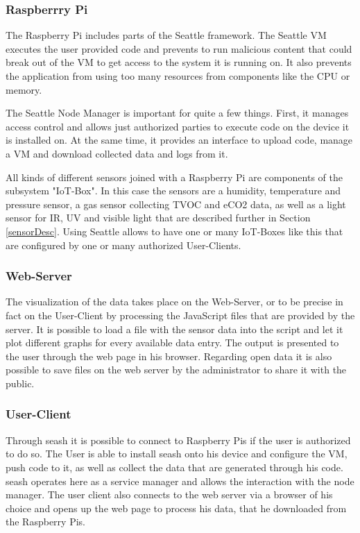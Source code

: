 \documentclass[bachelorthesis, grey, english]{mas-thesis-chapters} %
\begin{document}
\subsubsection{Raspberrry Pi}

The Raspberry Pi includes parts of the Seattle framework. The Seattle \gls{VM} executes the user provided code and prevents to run malicious content that could break out of the \gls{VM} to get access to the system it is running on. It also prevents the application from using too many resources from components like the \gls{CPU} or memory. \cite[38]{seattlePaper}

The Seattle Node Manager is important for quite a few things. First, it manages access control and allows just authorized parties to execute code on the device it is installed on. At the same time, it provides an interface to upload code, manage a \gls{VM} and download collected data and logs from it. \cite[38]{seattlePaper}

All kinds of different sensors joined with a Raspberry Pi are components of the subsystem "\gls{IoT}-Box". In this case the sensors are a humidity, temperature and pressure sensor, a gas sensor collecting \gls{TVOC} and \gls{eCO2} data, as well as a light sensor for \gls{IR}, \gls{UV} and visible light that are described further in Section \ref{sensorDesc}. Using Seattle allows to have one or many \gls{IoT}-Boxes like this that are configured by one or many authorized User-Clients.

\subsubsection{Web-Server}

The visualization of the data takes place on the Web-Server, or to be precise in fact on the User-Client by processing the JavaScript files that are provided by the server. It is possible to load a file with the sensor data into the script and let it plot different graphs for every available data entry. The output is presented to the user through the web page in his browser. Regarding open data it is also possible to save files on the web server by the administrator to share it with the public.

\subsubsection{User-Client}

Through \gls{seash} it is possible to connect to Raspberry Pis if the user is authorized to do so. The User is able to install \gls{seash} onto his device and configure the \gls{VM}, push code to it, as well as collect the data that are generated through his code. \Gls{seash} operates here as a service manager and allows the interaction with the node manager. The user client also connects to the web server via a browser of his choice and opens up the web page to process his data, that he downloaded from the Raspberry Pis. \cite[38]{seattlePaper}
\end{document}

